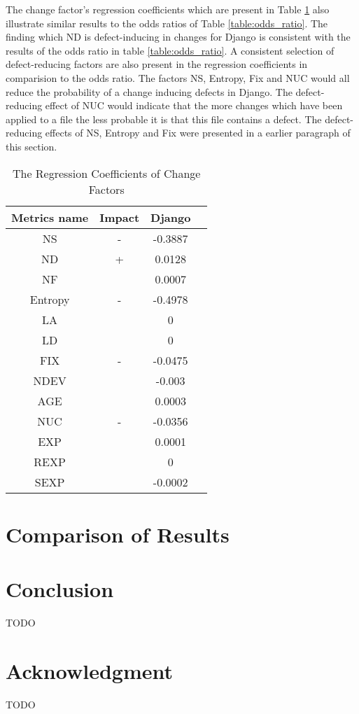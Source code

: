 \documentclass[10pt, conference]{IEEEtran}
\begin{document}
The change factor's regression coefficients which are present in Table \ref{table:regression_coefficients} also illustrate similar results to the odds ratios of Table \ref{table:odds_ratio}. The finding which ND is defect-inducing in changes for Django is consistent with the results of the odds ratio in table \ref{table:odds_ratio}. A consistent selection of defect-reducing factors are also present in the regression coefficients in comparision to the odds ratio. The factors NS, Entropy, Fix and NUC would all reduce the probability of a change inducing defects in Django. The defect-reducing effect of NUC would indicate that the more changes which have been applied to a file the less probable it is that this file contains a defect. The defect-reducing effects of NS, Entropy and Fix were presented in a earlier paragraph of this section.
\begin{table}
	\centering
	\caption{The Regression Coefficients of Change Factors}
	\begin{tabular}{|c|c|c|c|}
		\hline Metrics name & Impact & Django \\ 
		\hline NS & - & -0.3887 \\ 
		\hline ND & + & 0.0128 \\ 
		\hline NF &  & 0.0007 \\ 
		\hline Entropy & - & -0.4978 \\ 
		\hline LA &  & 0 \\ 
		\hline LD &  & 0 \\ 
		\hline FIX & - & -0.0475 \\ 
		\hline NDEV &  & -0.003 \\ 
		\hline AGE &  & 0.0003 \\ 
		\hline NUC & - & -0.0356 \\ 
		\hline EXP &  & 0.0001 \\ 
		\hline REXP &  & 0 \\ 
		\hline SEXP &  & -0.0002 \\ 
		\hline 
	\end{tabular}
	\label{table:regression_coefficients} 
\end{table}


\section{Comparison of Results}
\label{sec:comparison-results}

\section{Conclusion}
\label{sec:conclusion}

TODO

\section*{Acknowledgment}
TODO

\balance


\end{document}
